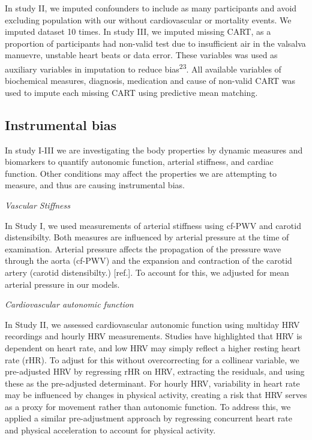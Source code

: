 \documentclass[
  a4paper,
  headsepline=true,
  open=any]{scrbook}
\begin{document}
In study II, we imputed confounders to include as many participants and
avoid excluding population with our without cardiovascular or mortality
events. We imputed dataset 10 times. In study III, we imputed missing
CART, as a proportion of participants had non-valid test due to
insufficient air in the valsalva manuevre, unstable heart beats or data
error. These variables was used as auxiliary variables in imputation to
reduce bias\textsuperscript{23}. All available variables of biochemical
measures, diagnosis, medication and cause of non-valid CART was used to
impute each missing CART using predictive mean matching.

\hypertarget{instrumental-bias}{%
\subsection{Instrumental bias}\label{instrumental-bias}}

In study I-III we are investigating the body properties by dynamic
measures and biomarkers to quantify autonomic function, arterial
stiffness, and cardiac function. Other conditions may affect the
properties we are attempting to measure, and thus are causing
instrumental bias.

\emph{Vascular Stiffness}

In Study I, we used measurements of arterial stiffness using cf-PWV and
carotid distensibilty. Both measures are influenced by arterial pressure
at the time of examination. Arterial pressure affects the propagation of
the pressure wave through the aorta (cf-PWV) and the expansion and
contraction of the carotid artery (carotid distensibilty.) {[}ref.{]}.
To account for this, we adjusted for mean arterial pressure in our
models.

\emph{Cardiovascular autonomic function}

In Study II, we assessed cardiovascular autonomic function using
multiday HRV recordings and hourly HRV measurements. Studies have
highlighted that HRV is dependent on heart rate, and low HRV may simply
reflect a higher resting heart rate (rHR). To adjust for this without
overcorrecting for a collinear variable, we pre-adjusted HRV by
regressing rHR on HRV, extracting the residuals, and using these as the
pre-adjusted determinant. For hourly HRV, variability in heart rate may
be influenced by changes in physical activity, creating a risk that HRV
serves as a proxy for movement rather than autonomic function. To
address this, we applied a similar pre-adjustment approach by regressing
concurrent heart rate and physical acceleration to account for physical
activity.
\end{document}
